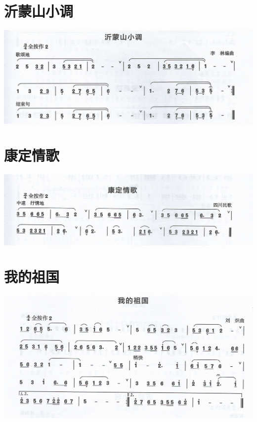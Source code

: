 \documentclass[cn,pad,chinese,chinesefont=nofont]{elegantbook}
\begin{document}
\section{沂蒙山小调}
	\includegraphics[width=\textwidth]{dongxiao/Scan 18-2.jpeg}
\section{康定情歌}
	\includegraphics[width=\textwidth]{dongxiao/Scan 18-3.jpeg}

\section{我的祖国}
	\includegraphics[width=\textwidth]{dongxiao/Scan 19-1.jpeg}
\end{document}
